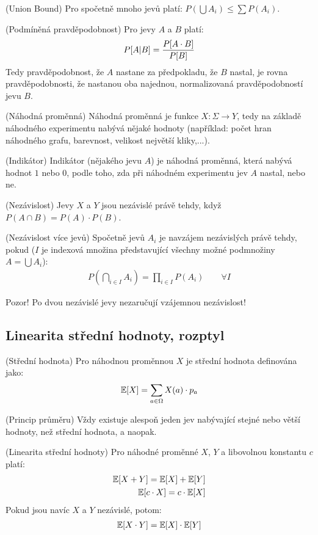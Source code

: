 \tv (Union Bound) Pro spočetně mnoho jevů platí: $P(\bigcup A_i) \leq \sum
P(A_i)$.

\df (Podmíněná pravděpodobnost) Pro jevy $A$ a $B$ platí:
\begin{align}
	P[A|B] = {P[A \cdot B] \over P[B]}
\end{align}
Tedy pravděpodobnost, že $A$ nastane za předpokladu, že $B$ nastal, je rovna
pravděpodobnosti, že nastanou oba najednou, normalizovaná pravděpodobností jevu
$B$.

\df (Náhodná proměnná) Náhodná proměnná je funkce $X: \Sigma \to Y$, tedy na
základě náhodného experimentu nabývá nějaké hodnoty (například: počet hran
náhodného grafu, barevnost, velikost největší kliky,...).

\df (Indikátor) Indikátor (nějakého jevu $A$) je náhodná proměnná, která nabývá
hodnot $1$ nebo $0$, podle toho, zda při náhodném experimentu jev $A$ nastal,
nebo ne.

\df (Nezávislost) Jevy $X$ a $Y$ jsou nezávislé právě tehdy, když $P(A\cap B) =
P(A) \cdot P(B)$.

\df (Nezávislost více jevů) Spočetně jevů $A_i$ je navzájem nezávislých právě
tehdy, pokud ($I$ je indexová množina představující všechny možné podmnožiny $A
= \bigcup A_i$):
\begin{align}
	P\left(\bigcap_{i \in I} A_i\right) = \prod_{i\in I} P(A_i) \qquad \forall I
\end{align}

\pzn Pozor! Po dvou nezávislé jevy nezaručují vzájemnou nezávislost!

\subsection{Linearita střední hodnoty, rozptyl}

\df (Střední hodnota) Pro náhodnou proměnnou $X$ je střední hodnota definována
jako:
\begin{align}
	\mathbb{E}[X] = \sum_{a \in \Omega} X(a) \cdot p_a
\end{align}

\vt (Princip průměru) Vždy existuje alespoň jeden jev nabývající stejné nebo
větší hodnoty, než střední hodnota, a naopak.

\vt (Linearita střední hodnoty) Pro náhodné proměnné $X$, $Y$ a libovolnou
konstantu $c$ platí:
\begin{align}
	\mathbb{E}[X+Y] = \mathbb{E}[X] + \mathbb{E}[Y] \\
	\mathbb{E}[c \cdot X] = c \cdot \mathbb{E}[X]
\end{align}
Pokud jsou navíc $X$ a $Y$ nezávislé, potom:
\begin{align}
	\mathbb{E}[X \cdot Y] = \mathbb{E}[X] \cdot \mathbb{E}[Y]
\end{align}

